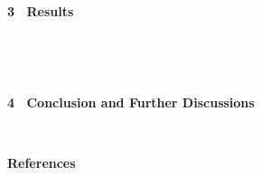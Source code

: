 \documentclass[portrait,a0,posterdraft]{a0poster} %
\def\exMinipage{782mm}
\def\exHalfMinipage{380mm}
\def\exSubHalfMinipage{369mm}
\begin{document}
{{{\begin{minipage}[t]{\exMinipage}
\begin{minipage}[t]{\exHalfMinipage}
\begin{minipage}[t]{\exHalfMinipage}%
\LARGE{\white  \bf 3 \ Results}\\[-10pt]
\begin{minipage}[t]{\exSubHalfMinipage}
\begin{mdframed}[style=smallframe]
\resultstext
\end{mdframed}
\end{minipage}
\end{minipage}%
\\[40pt]

\end{minipage}%
\hspace{0.2cm}
\begin{minipage}[t]{\exHalfMinipage}



\begin{minipage}[t]{\exHalfMinipage}%
\begin{minipage}[t]{\exSubHalfMinipage}
\begin{mdframed}[style=smallframe]
\resultstexttwo
\end{mdframed}
\end{minipage} 
\end{minipage}%
\\[40pt]

\begin{minipage}[t]{\exHalfMinipage}%
\LARGE{\white  \bf 4 \ Conclusion and Further Discussions}\\[-10pt]
\begin{minipage}[t]{\exSubHalfMinipage}
\begin{mdframed}[style=smallframe]
\conclusiontext
\end{mdframed}
\end{minipage} 
\end{minipage}%
\\[40pt]
\begin{minipage}[t]{\exHalfMinipage}%
\Large{ \white \bf References}\\[-10pt]
\begin{minipage}[t]{\exSubHalfMinipage}
\begin{mdframed}[style=smallframe]
{\normalsize \black 
{\def\section*#1{}


}
\bibliotext
}
\end{mdframed}
\end{minipage} 
\end{minipage}%


\end{minipage}
\end{minipage}}}}
\end{document}
